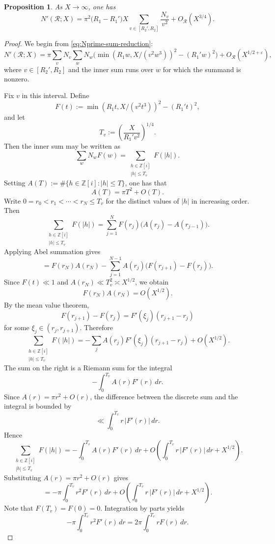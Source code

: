 \documentclass[10pt,a4paper]{amsart}
\newtheorem{proposition}{Proposition}
\newcommand{\Z}{\mathbb{Z}}
\begin{document}
\begin{proposition}\label{Propn N' count}
As $X\to\infty$, one has
\[
N'(\mathcal R;X)
=
\pi^2\bigl(R_1-R_1'\bigr)
X
\sum_{v\in[R_2',R_2]}
\frac{N_v}{v^2}
+
O_{\mathcal R}(X^{3/4}).
\]
\end{proposition}

\begin{proof}
We begin from \eqref{eq:Nprime-sum-reduction}:
\[
N'(\mathcal R;X)
=
\pi
\sum_{v} N_v
\sum_{w}
N_w
\Big(
\min(R_1w,X/(v^2w^3))^2
-
(R_1'w)^2
\Big)
+
O_{\mathcal R}(X^{1/2+\varepsilon}),
\]
where $v\in[R_2',R_2]$ and the inner sum runs over $w$ for which the
summand is nonzero.

Fix $v$ in this interval.  Define
\[
F(t)
:=
\min(R_1t,X/(v^2t^3))^2
-
(R_1't)^2,
\]
and let
\[
T_v := \left(\frac{X}{R_1'v^2}\right)^{1/4}.
\]
Then the inner sum may be written as
\[
\sum_{w} N_w F(w)
=
\sum_{\substack{h\in\Z[i]\\ |h|\le T_v}} F(|h|).
\]
Setting $A(T):=\#\{h\in\Z[i]: |h|\le T\}$, one has that
\[
A(T)=\pi T^2+O(T).
\]
\noindent Write $0=r_0<r_1<\cdots<r_N\le T_v$ for the distinct values of $|h|$ in
increasing order.  Then
\[
\sum_{\substack{h\in\Z[i]\\ |h|\le T_v}} F(|h|)
=
\sum_{j=1}^N F(r_j)\bigl(A(r_j)-A(r_{j-1})\bigr).
\]
\noindent Applying Abel summation gives
\[
=
F(r_N)A(r_N)
-
\sum_{j=1}^{N-1} A(r_j)\bigl(F(r_{j+1})-F(r_j)\bigr).
\]
Since $F(t)\ll 1$ and $A(r_N)\ll T_v^2\asymp X^{1/2}$, we obtain
\[
F(r_N)A(r_N)=O(X^{1/2}).
\]
By the mean value theorem,
\[
F(r_{j+1})-F(r_j)
=
F'(\xi_j)(r_{j+1}-r_j)
\]
for some $\xi_j\in(r_j,r_{j+1})$.  Therefore
\[
\sum_{\substack{h\in\Z[i]\\ |h|\le T_v}} F(|h|)
=
-\sum_{j} A(r_j)F'(\xi_j)(r_{j+1}-r_j)
+
O(X^{1/2}).
\]
\noindent The sum on the right is a Riemann sum for the integral
\[
-\int_0^{T_v} A(r)F'(r)\,dr.
\]
Since $A(r)=\pi r^2+O(r)$, the difference between the discrete sum and the
integral is bounded by
\[
\ll \int_0^{T_v} r\,|F'(r)|\,dr.
\]
Hence
\[
\sum_{\substack{h\in\Z[i]\\ |h|\le T_v}} F(|h|)
=
-\int_0^{T_v} A(r)F'(r)\,dr
+
O\!\left(
\int_0^{T_v} r\,|F'(r)|\,dr
+
X^{1/2}
\right).
\]
\noindent Substituting $A(r)=\pi r^2+O(r)$ gives
\[
=
-\pi\int_0^{T_v} r^2F'(r)\,dr
+
O\!\left(
\int_0^{T_v} r\,|F'(r)|\,dr
+
X^{1/2}
\right).
\]
Note that $F(T_v)=F(0)=0$. Integration by parts yields
\[
-\pi\int_0^{T_v} r^2F'(r)\,dr
=
2\pi\int_0^{T_v} rF(r)\,dr.
\]


\end{proof}
\end{document}

